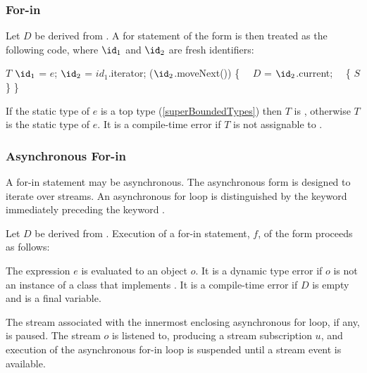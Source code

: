 \documentclass[makeidx]{article}
\begin{document}
{%


\subsubsection{For-in}

\LMHash{}%
Let $D$ be derived from .
A for statement of the form 
is then treated as the following code,
where $\id_1$ and $\id_2$ are fresh identifiers:

\begin{normativeDartCode}
$T$ $\id_1$ = $e$;
\VAR{} $\id_2$ = $id_1$.iterator;
\WHILE{} ($\id_2$.moveNext()) \{
\ \ $D$ \id{} = $\id_2$.current;
\ \ \{ $S$ \}
\}
\end{normativeDartCode}

\noindent
If the static type of $e$ is a top type
(\ref{superBoundedTypes})
then $T$ is ,
otherwise $T$ is the static type of $e$.
It is a compile-time error if $T$ is not assignable to .



\subsubsection{Asynchronous For-in}

\LMHash{}%
A for-in statement may be asynchronous.
The asynchronous form is designed to iterate over streams.
An asynchronous for loop is distinguished by the keyword \AWAIT{} immediately preceding the keyword \FOR.

\LMHash{}%
Let $D$ be derived from .
Execution of a for-in statement, $f$, of the form
proceeds as follows:

\LMHash{}%
The expression $e$ is evaluated to an object $o$.
It is a dynamic type error if $o$ is not an instance of a class that implements .
It is a compile-time error if $D$ is empty and \id{} is a final variable.

\LMHash{}%
The stream associated with the innermost enclosing asynchronous for loop, if any, is paused.
The stream $o$ is listened to, producing a stream subscription $u$,
and execution of the asynchronous for-in loop is suspended
until a stream event is available.

}
\end{document}
